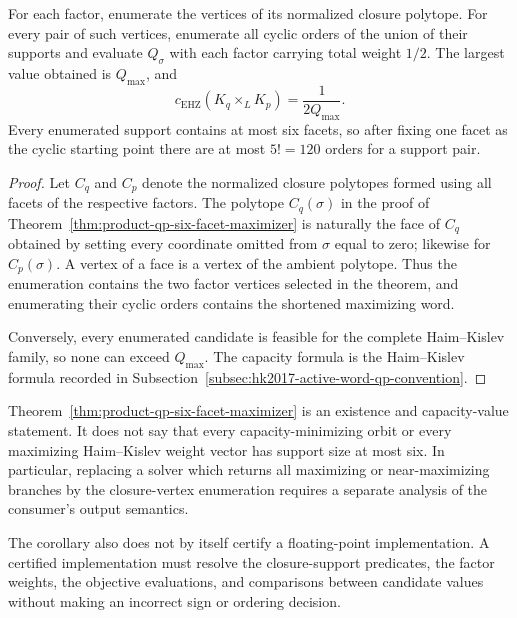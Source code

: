 \begin{unverified}
\begin{corollary}
\label{cor:product-qp-closure-vertex-enumeration}
For each factor, enumerate the vertices of its normalized closure polytope.
For every pair of such vertices, enumerate all cyclic orders of the union of
their supports and evaluate \(Q_\sigma\) with each factor carrying total
weight \(1/2\).  The largest value obtained is \(Q_{\max}\), and
\[
  c_{\mathrm{EHZ}}(K_q\times_LK_p)=\frac{1}{2Q_{\max}}.
\]
Every enumerated support contains at most six facets, so after fixing one
facet as the cyclic starting point there are at most \(5!=120\) orders for a
support pair.
\end{corollary}

\begin{proof}
Let \(C_q\) and \(C_p\) denote the normalized closure polytopes formed using
all facets of the respective factors.  The polytope \(C_q(\sigma)\) in the
proof of Theorem~\ref{thm:product-qp-six-facet-maximizer} is naturally the
face of \(C_q\) obtained by setting every coordinate omitted from \(\sigma\)
equal to zero; likewise for \(C_p(\sigma)\).  A vertex of a face is a vertex
of the ambient polytope.  Thus the enumeration contains the two factor
vertices selected in the theorem, and enumerating their cyclic orders contains
the shortened maximizing word.

Conversely, every enumerated candidate is feasible for the complete
Haim--Kislev family, so none can exceed \(Q_{\max}\).  The capacity formula is
the Haim--Kislev formula recorded in
Subsection~\ref{subsec:hk2017-active-word-qp-convention}.
\end{proof}

\begin{remark}
\label{rem:product-qp-six-facet-scope}
Theorem~\ref{thm:product-qp-six-facet-maximizer} is an existence and
capacity-value statement.  It does not say that every capacity-minimizing
orbit or every maximizing Haim--Kislev weight vector has support size at most
six.  In particular, replacing a solver which returns all maximizing or
near-maximizing branches by the closure-vertex enumeration requires a separate
analysis of the consumer's output semantics.

The corollary also does not by itself certify a floating-point implementation.
A certified implementation must resolve the closure-support predicates, the
factor weights, the objective evaluations, and comparisons between candidate
values without making an incorrect sign or ordering decision.
\end{remark}


\end{unverified}
